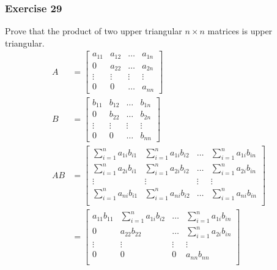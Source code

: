 \documentclass{math}
\begin{document}
\subsubsection*{Exercise 29}
Prove that the product of two upper triangular \( n\times n \) matrices is
upper triangular. \\
\begin{align*}
  A &= \begin{bmatrix}
    a_{11} & a_{12} & \dots & a_{1n} \\
    0 & a_{22} & \dots & a_{2n} \\
    \vdots & \vdots & \vdots & \vdots \\
    0 & 0 & \dots & a_{nn}
  \end{bmatrix} \\
  B &= \begin{bmatrix}
    b_{11} & b_{12} & \dots & b_{1n} \\
    0 & b_{22} & \dots & b_{2n} \\
    \vdots & \vdots & \vdots & \vdots \\
    0 & 0 & \dots & b_{nn}
  \end{bmatrix} \\
  AB &= \begin{bmatrix}
    \sum_{i=1}^{n}a_{1i}b_{i1} & \sum_{i=1}^{n}a_{1i}b_{i2} & \dots &
      \sum_{i=1}^{n}a_{1i}b_{in} \\[1em]
    \sum_{i=1}^{n}a_{2i}b_{i1} & \sum_{i=1}^{n}a_{2i}b_{i2} & \dots &
      \sum_{i=1}^{n}a_{2i}b_{in} \\[1em]
    \vdots & \vdots & \vdots & \vdots \\[1em]
    \sum_{i=1}^{n}a_{ni}b_{i1} & \sum_{i=1}^{n}a_{ni}b_{i2} & \dots &
      \sum_{i=1}^{n}a_{ni}b_{in} \\[1em]
  \end{bmatrix} \\
  &= \begin{bmatrix}
    a_{11}b_{11} & \sum_{i=1}^{n}a_{1i}b_{i2} & \dots &
      \sum_{i=1}^{n}a_{1i}b_{in} \\[1em]
    0 & a_{22}b_{22} & \dots & \sum_{i=1}^{n}a_{2i}b_{in} \\[1em]
    \vdots & \vdots & \vdots & \vdots \\[1em]
    0 & 0 & 0 & a_{nn}b_{nn} \\[1em]
  \end{bmatrix}
\end{align*}
\end{document}
